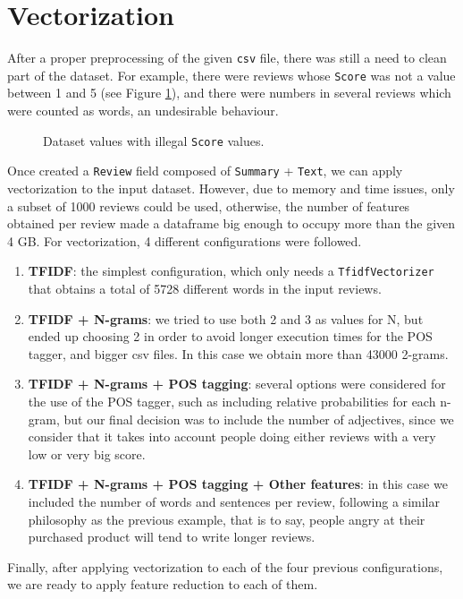 \section{Vectorization}
After a proper preprocessing of the given \texttt{csv} file, there was still a need to clean part of the dataset. For example, there were reviews whose \texttt{Score} was not a value between 1 and 5 (see Figure \ref{Figure_Vectorization_01}), and there were numbers in several reviews which were counted as words, an undesirable behaviour.

\begin{figure}[h!]
	\centering
	\caption{Dataset values with illegal \texttt{Score} values.}
	\label{Figure_Vectorization_01}
\end{figure}

Once created a \texttt{Review} field composed of \texttt{Summary} + \texttt{Text}, we can apply vectorization to the input dataset. However, due to memory and time issues, only a subset of 1000 reviews could be used, otherwise, the number of features obtained per review made a dataframe big enough to occupy more than the given 4 GB. For vectorization, 4 different configurations were followed.

\begin{enumerate}
    \item \textbf{TFIDF}: the simplest configuration, which only needs a \texttt{TfidfVectorizer} that obtains a total of 5728 different words in the input reviews.
    \item \textbf{TFIDF + N-grams}: we tried to use both 2 and 3 as values for N, but ended up choosing 2 in order to avoid longer execution times for the POS tagger, and bigger csv files. In this case we obtain more than 43000 2-grams.
    \newpage
    \item \textbf{TFIDF + N-grams + POS tagging}: several options were considered for the use of the POS tagger, such as including relative probabilities for each n-gram, but our final decision was to include the number of adjectives, since we consider that it takes into account people doing either reviews with a very low or very big score.
    \item \textbf{TFIDF + N-grams + POS tagging + Other features}: in this case we included the number of words and sentences per review, following a similar philosophy as the previous example, that is to say, people angry at their purchased product will tend to write longer reviews.
\end{enumerate}

Finally, after applying vectorization to each of the four previous configurations, we are ready to apply feature reduction to each of them.